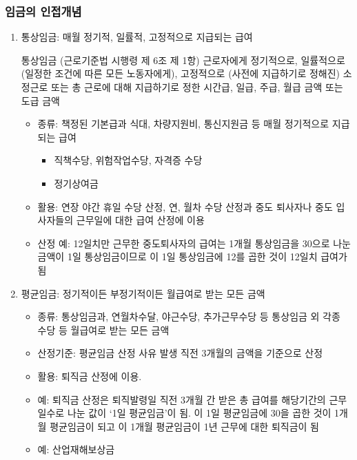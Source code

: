 \documentclass[aspectratio=169,xcolor=dvipsnames,handout]{beamer}
\begin{document}
\begin{frame}[allowframebreaks]
    \frametitle{임금의 인접개념}
    \begin{enumerate}[<+->]
        \item 통상임금: 매월 정기적, 일률적, 고정적으로 지급되는 급여
        \begin{block}{통상임금 (근로기준법 시행령 제 6조 제 1항)}
            근로자에게 정기적으로, 일률적으로 (일정한 조건에 따른 모든 노동자에게), 고정적으로 (사전에 지급하기로 정해진) 소정근로 또는 총 근로에 대해 지급하기로 정한 시간급, 일급, 주급, 월급 금액 또는 도급 금액
        \end{block}
        \framebreak%
        \begin{itemize}[<+->]
            \item 종류: 책정된 기본급과 식대, 차량지원비, 통신지원금 등 매월 정기적으로 지급되는 급여
            \begin{itemize}[<+->]
                \item 직책수당, 위험작업수당, 자격증 수당 
                \item 정기상여금
            \end{itemize}
            \item 활용: 연장 야간 휴일 수당 산정, 연, 월차 수당 산정과 중도 퇴사자나 중도 입사자들의 근무일에 대한 급여 산정에 이용
            \item 산정 예: 12일치만 근무한 중도퇴사자의 급여는 1개월 통상임금을 30으로 나눈 금액이 1일 통상임금이므로 이 1일 통상임금에 12를 곱한 것이 12일치 급여가 됨
        \end{itemize}
        \framebreak%
        \item 평균임금: 정기적이든 부정기적이든 월급여로 받는 모든 금액
            \begin{itemize}[<+->]
                \item 종류: 통상임금과, 연월차수달, 야근수당, 추가근무수당 등 통상임금 외 각종 수당 등 월급여로 받는 모든 금액
                \item 산정기준: 평균임금 산정 사유 발생 직전 3개월의 금액을 기준으로 산정
                \item 활용: 퇴직금 산정에 이용.
                \item 예: 퇴직금 산정은 퇴직발령일 직전 3개월 간 받은 총 급여를 해당기간의 근무일수로 나눈 값이 `1일 평균임금'이 됨. 이 1일 평균임금에 30을 곱한 것이 1개월 평균임금이 되고 이 1개월 평균임금이 1년 근무에 대한 퇴직금이 됨
                \item 예: 산업재해보상금
            \end{itemize}

\end{enumerate}
\end{frame}
\end{document}
